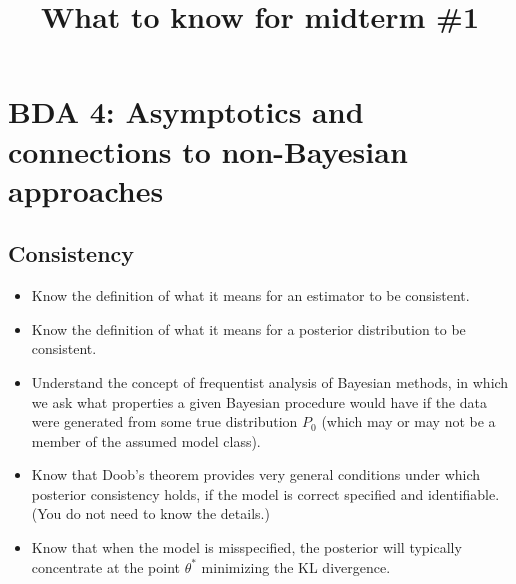\documentclass[12pt]{article}
\title{What to know for midterm \#1}
\author{}
\date{}
\begin{document}
\maketitle

\section{BDA 4: Asymptotics and connections to non-Bayesian approaches}

\subsection{Consistency}
\begin{itemize}
\item Know the definition of what it means for an estimator to be consistent.
\item Know the definition of what it means for a posterior distribution to be consistent.
\item Understand the concept of frequentist analysis of Bayesian methods, in which we ask what properties a given Bayesian procedure would have if the data were generated from some true distribution $P_0$ (which may or may not be a member of the assumed model class).
\item Know that Doob's theorem provides very general conditions under which posterior consistency holds, if the model is correct specified and identifiable. (You do not need to know the details.)
\item Know that when the model is misspecified, the posterior will typically concentrate at the point $\theta^*$ minimizing the KL divergence. 
\end{itemize}
\end{document}
